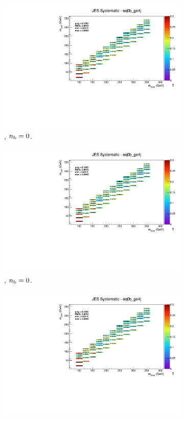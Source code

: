 \begin{figure}[ht!]
\begin{subfigure}[b]{0.32\textwidth}
    \includegraphics[width=\textwidth, page=12]{Figs/sms/t2cc/v37/systs/T2cc_JES_eq0b_ge4j.pdf}
    \caption{\njhigh, $n_{\text{b}} = 0$.}
  \end{subfigure}
  \begin{subfigure}[b]{0.32\textwidth}
    \includegraphics[width=\textwidth, page=8]{Figs/sms/t2cc/v37/systs/T2cc_JES_eq0b_ge4j.pdf}
    \caption{\njhigh, $n_{\text{b}} = 0$.}
  \end{subfigure}
  \begin{subfigure}[b]{0.32\textwidth}
    \includegraphics[width=\textwidth, page=1]{Figs/sms/t2cc/v37/systs/T2cc_JES_eq0b_ge4j.pdf}

\end{subfigure}
\end{figure}
